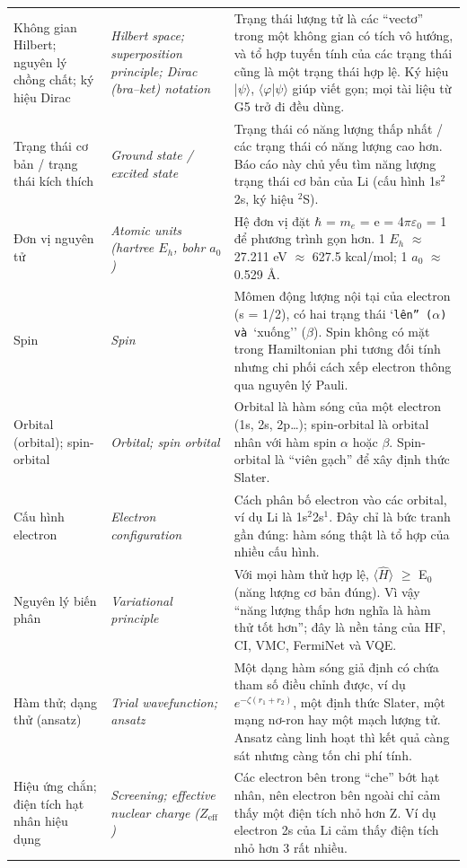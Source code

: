\begin{longtable}{@{}>{\raggedright\arraybackslash}p{}>{\raggedright\arraybackslash\itshape}p{}>{\raggedright\arraybackslash}p{}@{}}
Không gian Hilbert; nguyên lý chồng chất; ký hiệu Dirac & Hilbert space; superposition principle; Dirac (bra–ket) notation & Trạng thái lượng tử là các ``vectơ'' trong một không gian có tích vô hướng, và tổ hợp tuyến tính của các trạng thái cũng là một trạng thái hợp lệ. Ký hiệu |$\psi\rangle$, $\langle\varphi$|$\psi\rangle$ giúp viết gọn; mọi tài liệu từ G5 trở đi đều dùng. \\[2pt]
Trạng thái cơ bản / trạng thái kích thích & Ground state / excited state & Trạng thái có năng lượng thấp nhất / các trạng thái có năng lượng cao hơn. Báo cáo này chủ yếu tìm năng lượng trạng thái cơ bản của Li (cấu hình 1s$^{2}$2s, ký hiệu $^{2}$S). \\[2pt]
Đơn vị nguyên tử & Atomic units (hartree $E_h$, bohr $a_0$) & Hệ đơn vị đặt $\hbar$ = $m_e$ = e = 4$\pi\varepsilon_0$ = 1 để phương trình gọn hơn. 1 $E_h$ $\approx$ 27.211 eV $\approx$ 627.5 kcal/mol; 1 $a_0$ $\approx$ 0.529 Å. \\[2pt]
Spin & Spin & Mômen động lượng nội tại của electron (s = 1/2), có hai trạng thái `\texttt{lên'' ($\alpha$) và }`xuống'' ($\beta$). Spin không có mặt trong Hamiltonian phi tương đối tính nhưng chi phối cách xếp electron thông qua nguyên lý Pauli. \\[2pt]
Orbital (orbital); spin-orbital & Orbital; spin orbital & Orbital là hàm sóng của một electron (1s, 2s, 2p…); spin-orbital là orbital nhân với hàm spin $\alpha$ hoặc $\beta$. Spin-orbital là ``viên gạch'' để xây định thức Slater. \\[2pt]
Cấu hình electron & Electron configuration & Cách phân bố electron vào các orbital, ví dụ Li là 1s$^{2}$2s$^{1}$. Đây chỉ là bức tranh gần đúng: hàm sóng thật là tổ hợp của nhiều cấu hình. \\[2pt]
Nguyên lý biến phân & Variational principle & Với mọi hàm thử hợp lệ, $\langle\hat H\rangle$ $\ge$ E$_{0}$ (năng lượng cơ bản đúng). Vì vậy ``năng lượng thấp hơn nghĩa là hàm thử tốt hơn''; đây là nền tảng của HF, CI, VMC, FermiNet và VQE. \\[2pt]
Hàm thử; dạng thử (ansatz) & Trial wavefunction; ansatz & Một dạng hàm sóng giả định có chứa tham số điều chỉnh được, ví dụ $e^{-\zeta(r_1+r_2)}$, một định thức Slater, một mạng nơ-ron hay một mạch lượng tử. Ansatz càng linh hoạt thì kết quả càng sát nhưng càng tốn chi phí tính. \\[2pt]
Hiệu ứng chắn; điện tích hạt nhân hiệu dụng & Screening; effective nuclear charge ($Z_{\mathrm{eff}}$) & Các electron bên trong ``che'' bớt hạt nhân, nên electron bên ngoài chỉ cảm thấy một điện tích nhỏ hơn Z. Ví dụ electron 2s của Li cảm thấy điện tích nhỏ hơn 3 rất nhiều. \\[2pt]

\end{longtable}
